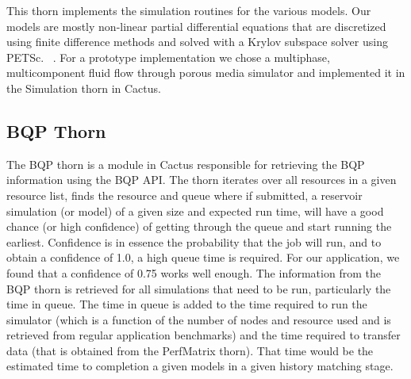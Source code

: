 \documentclass[conference,final]{IEEEtran}
\begin{document}
This thorn implements the simulation routines for the various models.
Our models are mostly non-linear partial differential equations that
are discretized using finite difference methods and solved with a
Krylov subspace solver using PETSc. ~\cite{PETSc}. For a prototype
implementation we chose a multiphase, multicomponent fluid flow
through porous media simulator and implemented it in the Simulation
thorn in Cactus.


\subsection{BQP Thorn}
The BQP thorn is a module in Cactus responsible for retrieving the BQP
information using the BQP API. The thorn iterates over all resources
in a given resource list, finds the resource and queue where if
submitted, a reservoir simulation (or model) of a given size and
expected run time, will have a good chance (or high confidence) of
getting through the queue and start running the earliest. Confidence
is in essence the probability that the job will run, and to obtain a
confidence of 1.0, a high queue time is required. For our application,
we found that a confidence of 0.75 works well enough. The information from the BQP thorn is retrieved for all simulations
that need to be run, particularly the time in queue. The time in queue
is added to the time required to run the simulator (which is a
function of the number of nodes and resource used and is retrieved
from regular application benchmarks) and the time required to transfer
data (that is obtained from the PerfMatrix thorn).  That time would be
the estimated time to completion a given models in a given history
matching stage.
\end{document}
